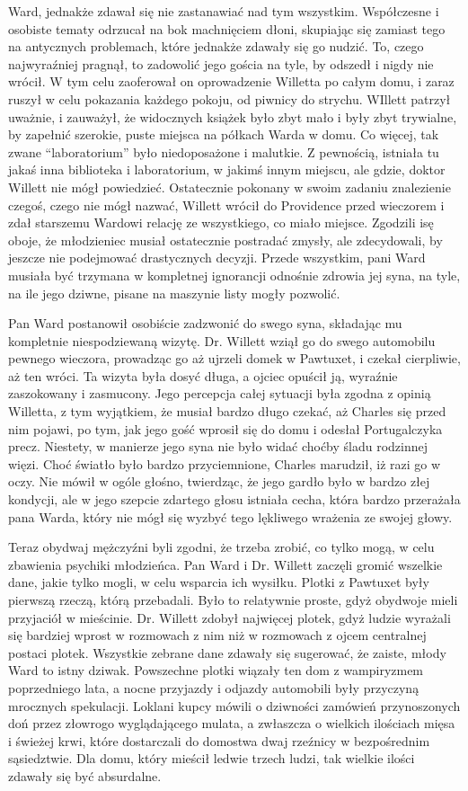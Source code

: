 Ward, jednakże zdawał się nie zastanawiać nad tym wszystkim. Współczesne i osobiste tematy odrzucał na bok machnięciem dłoni, skupiając się zamiast tego na antycznych problemach, które jednakże zdawały się go nudzić. To, czego najwyraźniej pragnął, to zadowolić jego gościa na tyle, by odszedł i nigdy nie wrócił. W tym celu zaoferował on oprowadzenie Willetta po całym domu, i zaraz ruszył w celu pokazania każdego pokoju, od piwnicy do strychu. WIllett patrzył uważnie, i zauważył, że widocznych książek było zbyt mało i były zbyt trywialne, by zapełnić szerokie, puste miejsca na półkach Warda w domu. Co więcej, tak zwane ``laboratorium'' było niedoposażone i malutkie. Z pewnością, istniała tu jakaś inna biblioteka i laboratorium, w jakimś innym miejscu, ale gdzie, doktor Willett nie mógł powiedzieć. Ostatecznie pokonany w swoim zadaniu znalezienie czegoś, czego nie mógł nazwać, Willett wrócił do Providence przed wieczorem i zdał starszemu Wardowi relację ze wszystkiego, co miało miejsce. Zgodzili isę oboje, że młodzieniec musiał ostatecznie postradać zmysły, ale zdecydowali, by jeszcze nie podejmować drastycznych decyzji. Przede wszystkim, pani Ward musiała być trzymana w kompletnej ignorancji odnośnie zdrowia jej syna, na tyle, na ile jego dziwne, pisane na maszynie listy mogły pozwolić. 

Pan Ward postanowił osobiście zadzwonić do swego syna, składając mu kompletnie niespodziewaną wizytę. Dr. Willett wziął go do swego automobilu pewnego wieczora, prowadząc go aż ujrzeli domek w Pawtuxet, i czekał cierpliwie, aż ten wróci. Ta wizyta była dosyć długa, a ojciec opuścił ją, wyraźnie zaszokowany i zasmucony. Jego percepcja całej sytuacji była zgodna z opinią Willetta, z tym wyjątkiem, że musiał bardzo długo czekać, aż Charles się przed nim pojawi, po tym, jak jego gość wprosił się do domu i odesłał Portugalczyka precz. Niestety, w manierze jego syna nie było widać choćby śladu rodzinnej więzi. Choć światło było bardzo przyciemnione, Charles marudził, iż razi go w oczy. Nie mówił w ogóle głośno, twierdząc, że jego gardło było w bardzo złej kondycji, ale w jego szepcie zdartego głosu istniała cecha, która bardzo przerażała pana Warda, który nie mógł się wyzbyć tego lękliwego wrażenia ze swojej głowy.

Teraz obydwaj mężczyźni byli zgodni, że trzeba zrobić, co tylko mogą, w celu zbawienia psychiki młodzieńca. Pan Ward i Dr. Willett zaczęli gromić wszelkie dane, jakie tylko mogli, w celu wsparcia ich wysiłku. Plotki z Pawtuxet były pierwszą rzeczą, którą przebadali. Było to relatywnie proste, gdyż obydwoje mieli przyjaciół w mieścinie. Dr. Willett zdobył najwięcej plotek, gdyż ludzie wyrażali się bardziej wprost w rozmowach z nim niż w rozmowach z ojcem centralnej postaci plotek. Wszystkie zebrane dane zdawały się sugerować, że zaiste, młody Ward to istny dziwak. Powszechne plotki wiązały ten dom z wampiryzmem poprzedniego lata, a nocne przyjazdy i odjazdy automobili były przyczyną mrocznych spekulacji. Loklani kupcy mówili o dziwności zamówień przynoszonych doń przez złowrogo wyglądającego mulata, a zwłaszcza o wielkich ilościach mięsa i świeżej krwi, które dostarczali do domostwa dwaj rzeźnicy w bezpośrednim sąsiedztwie. Dla domu, który mieścił ledwie trzech ludzi, tak wielkie ilości zdawały się być absurdalne.  

